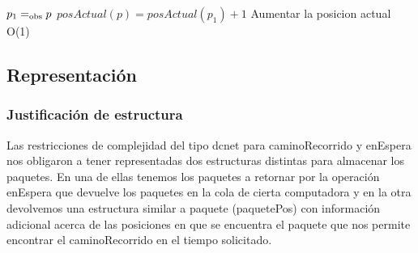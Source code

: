  {$p_1 =_{\mathrm{obs}} p$}
 {$posActual(p) = posActual(p_1) + 1$}
 {Aumentar la posicion actual}
 {O(1)}
 {}
  
\subsection{Representación}


\subsubsection*{Justificación de estructura}{
	Las restricciones de complejidad del tipo dcnet para caminoRecorrido y enEspera nos obligaron a tener representadas dos estructuras
	distintas para almacenar los paquetes. En una de ellas tenemos los paquetes a retornar por la operación enEspera que devuelve los 
	paquetes en la cola de cierta computadora y en la otra devolvemos una estructura similar a paquete (paquetePos) con información
	adicional acerca de las posiciones en que se encuentra el paquete que nos permite encontrar el caminoRecorrido en el tiempo solicitado.
}
